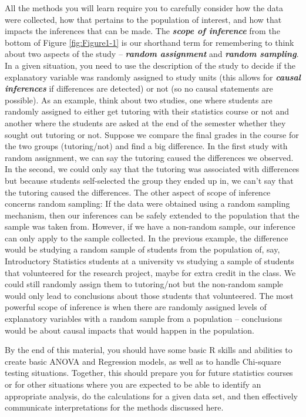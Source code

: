 \documentclass[]{book}
\renewcommand{\indent}{\hspace{15pt}}
\begin{document}
\indent All the methods you will learn require you to carefully consider how the data were collected, how that
pertains to the population of interest, and how that impacts the inferences
that can be made. The \textbf{\emph{scope of inference}} from the bottom of Figure
\ref{fig:Figure1-1} is our shorthand term for remembering to think about two aspects
of the study -- \textbf{\emph{random assignment}} and \textbf{\emph{random sampling}}.
  In a given
situation, you need to use the description of the study to decide if the
explanatory variable was randomly assigned to study units (this allows for \textbf{\emph{causal inferences}}  if differences are detected) or not (so no causal statements
are possible). As an example, think about two studies, one where students are
randomly assigned to either get tutoring with their statistics course or not
and another where the students are asked at the end of the semester whether
they sought out tutoring or not. Suppose we compare the final grades in the
course for the two groups (tutoring/not) and find a big difference. In the
first study with random assignment,  we can say the tutoring caused the
differences we observed. In the second, we could only say that the tutoring was
associated with differences but because students self-selected the group they
ended up in, we can't say that the tutoring caused the differences. The other
aspect of scope of inference concerns random sampling: If the data were obtained
using a random sampling mechanism, then our inferences can be safely extended
to the population that the sample was taken from. However, if we have a non-random
sample, our inference can only apply to the sample collected. In the previous
example, the difference would be studying a random sample of students from the
population of, say, Introductory Statistics students at a university vs
studying a sample of students that volunteered for the research project, maybe
for extra credit in the class. We could still randomly assign them to
tutoring/not but the non-random sample would only lead to conclusions about
those students that volunteered. The most powerful scope of inference is when there
are randomly assigned levels of explanatory variables with a random sample from
a population -- conclusions would be about causal impacts that would happen in the
population.

\indent By the end of this material, you should have some basic R skills and abilities to create basic ANOVA and
Regression models, as well as to handle Chi-square testing situations.
Together, this should prepare you for future statistics courses or for other
situations where you are expected to be able to identify an appropriate
analysis, do the calculations for a given data set, and then effectively
communicate interpretations for the methods discussed here.
\end{document}
